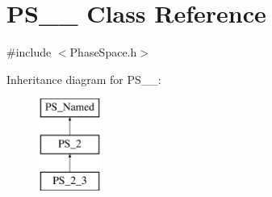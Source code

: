 \hypertarget{classPS__2__3}{}\section{P\+S\+\_\+\_ Class Reference}
\label{classPS__2__3}


{\ttfamily \#include $<$Phase\+Space.\+h$>$}

Inheritance diagram for P\+S\+\_\+\_\+:\begin{figure}[H]
\begin{center}
\leavevmode
\includegraphics[height=3.000000cm]{classPS__2__3}
\end{center}
\end{figure}
